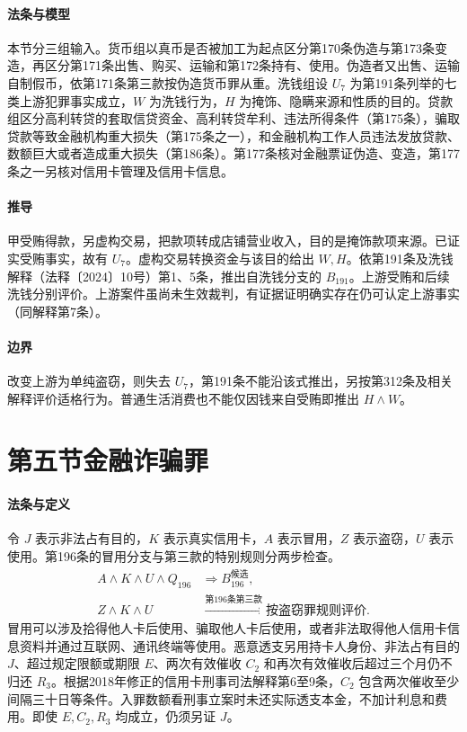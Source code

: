 \paragraph{法条与模型}
本节分三组输入。货币组以真币是否被加工为起点区分第170条伪造与第173条变造，再区分第171条出售、购买、运输和第172条持有、使用。伪造者又出售、运输自制假币，依第171条第三款按伪造货币罪从重。洗钱组设 \(U_7\) 为第191条列举的七类上游犯罪事实成立，\(W\) 为洗钱行为，\(H\) 为掩饰、隐瞒来源和性质的目的。贷款组区分高利转贷的套取信贷资金、高利转贷牟利、违法所得条件（第175条），骗取贷款等致金融机构重大损失（第175条之一），和金融机构工作人员违法发放贷款、数额巨大或者造成重大损失（第186条）。第177条核对金融票证伪造、变造，第177条之一另核对信用卡管理及信用卡信息。

\paragraph{推导}
甲受贿得款，另虚构交易，把款项转成店铺营业收入，目的是掩饰款项来源。已证实受贿事实，故有 \(U_7\)。虚构交易转换资金与该目的给出 \(W,H\)。依第191条及洗钱解释（法释〔2024〕10号）第1、5条，推出自洗钱分支的 \(B_{191}\)。上游受贿和后续洗钱分别评价。上游案件虽尚未生效裁判，有证据证明确实存在仍可认定上游事实（同解释第7条）。

\paragraph{边界}
改变上游为单纯盗窃，则失去 \(U_7\)，第191条不能沿该式推出，另按第312条及相关解释评价适格行为。普通生活消费也不能仅因钱来自受贿即推出 \(H\land W\)。

\section{第五节\quad 金融诈骗罪}

\paragraph{法条与定义}
令 \(J\) 表示非法占有目的，\(K\) 表示真实信用卡，\(A\) 表示冒用，\(Z\) 表示盗窃，\(U\) 表示使用。第196条的冒用分支与第三款的特别规则分两步检查。
\[
\begin{aligned}
A\land K\land U\land Q_{196}&\Longrightarrow B_{196}^{\text{候选}},\\
Z\land K\land U&\xrightarrow{\text{第196条第三款}}\text{按盗窃罪规则评价}.
\end{aligned}
\]
冒用可以涉及拾得他人卡后使用、骗取他人卡后使用，或者非法取得他人信用卡信息资料并通过互联网、通讯终端等使用。恶意透支另用持卡人身份、非法占有目的 \(J\)、超过规定限额或期限 \(E\)、两次有效催收 \(C_2\) 和再次有效催收后超过三个月仍不归还 \(R_3\)。根据2018年修正的信用卡刑事司法解释第6至9条，\(C_2\) 包含两次催收至少间隔三十日等条件。入罪数额看刑事立案时未还实际透支本金，不加计利息和费用。即使 \(E,C_2,R_3\) 均成立，仍须另证 \(J\)。

